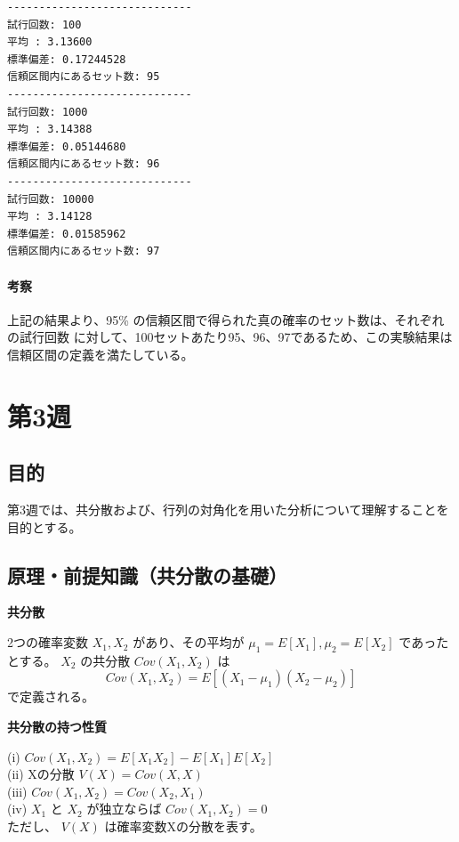 \documentclass[10pt,a4paper,titlepage]{jreport} %
\begin{document}
\begin{lstlisting}[caption=実験結果iib]
-----------------------------
試行回数: 100
平均 : 3.13600
標準偏差: 0.17244528
信頼区間内にあるセット数: 95
-----------------------------
試行回数: 1000
平均 : 3.14388
標準偏差: 0.05144680
信頼区間内にあるセット数: 96
-----------------------------
試行回数: 10000
平均 : 3.14128
標準偏差: 0.01585962
信頼区間内にあるセット数: 97
\end{lstlisting}

\subsubsection{考察}

上記の結果より、95\% の信頼区間で得られた真の確率のセット数は、それぞれの試行回数
に対して、100セットあたり95、96、97であるため、この実験結果は信頼区間の定義を満たしている。

\chapter{第3週}

\section{目的}

第3週では、共分散および、行列の対角化を用いた分析について理解することを目的とする。

\section{原理・前提知識（共分散の基礎）}

\textbf{共分散}

2つの確率変数 $X_1, X_2$ があり、その平均が $\mu_1 = E\left[X_1\right], \mu_2 = E\left[X_2\right]$ 
であったとする。
$X_2$ の共分散 $Cov(X_1, X_2)$ は
\begin{equation}
Cov(X_1, X_2) = E\left[(X_1 - \mu_1)(X_2 - \mu_2)\right]
\end{equation}
で定義される。

\textbf{共分散の持つ性質}

(i) $Cov(X_1, X_2) = E\left[X_1 X_2\right] - E\left[X_1\right]E\left[X_2\right]$ \\
(ii) Xの分散 $V(X) = Cov(X,X)$ \\
(iii) $Cov(X_1, X_2) = Cov(X_2, X_1)$ \\
(iv) $X_1$ と $X_2$ が独立ならば $Cov(X_1, X_2) = 0$ \\
ただし、 $V(X)$ は確率変数Xの分散を表す。
\end{document}
